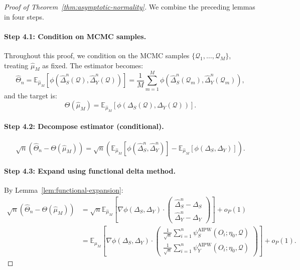 \begin{proof}[Proof of Theorem~\ref{thm:asymptotic-normality}]
We combine the preceding lemmas in four steps.

\paragraph{Step 4.1: Condition on MCMC samples.}
Throughout this proof, we condition on the MCMC samples $\{\mathcal{Q}_1, \ldots, \mathcal{Q}_M\}$, treating $\hat{\mu}_M$ as fixed. The estimator becomes:
\begin{equation}
\hat{\Theta}_n = \mathbb{E}_{\hat{\mu}_M}[\phi(\hat{\Delta}_S^n(\mathcal{Q}), \hat{\Delta}_Y^n(\mathcal{Q}))] = \frac{1}{M}\sum_{m=1}^M \phi(\hat{\Delta}_S^n(\mathcal{Q}_m), \hat{\Delta}_Y^n(\mathcal{Q}_m)),
\end{equation}
and the target is:
\begin{equation}
\Theta(\hat{\mu}_M) = \mathbb{E}_{\hat{\mu}_M}[\phi(\Delta_S(\mathcal{Q}), \Delta_Y(\mathcal{Q}))].
\end{equation}

\paragraph{Step 4.2: Decompose estimator (conditional).}
\begin{equation}
\sqrt{n}(\hat{\Theta}_n - \Theta(\hat{\mu}_M)) = \sqrt{n}\left(\mathbb{E}_{\hat{\mu}_M}[\phi(\hat{\Delta}_S^n, \hat{\Delta}_Y^n)] - \mathbb{E}_{\hat{\mu}_M}[\phi(\Delta_S, \Delta_Y)]\right).
\end{equation}

\paragraph{Step 4.3: Expand using functional delta method.}
By Lemma~\ref{lem:functional-expansion}:
\begin{align}
\sqrt{n}(\hat{\Theta}_n - \Theta(\hat{\mu}_M)) &= \sqrt{n} \mathbb{E}_{\hat{\mu}_M}\left[\nabla\phi(\Delta_S, \Delta_Y) \cdot \begin{pmatrix} \hat{\Delta}_S^n - \Delta_S \\ \hat{\Delta}_Y^n - \Delta_Y \end{pmatrix}\right] + o_P(1) \\
&= \mathbb{E}_{\hat{\mu}_M}\left[\nabla\phi(\Delta_S, \Delta_Y) \cdot \begin{pmatrix} \frac{1}{\sqrt{n}}\sum_{i=1}^n \psi_S^{\text{AIPW}}(O_i; \eta_0, \mathcal{Q}) \\ \frac{1}{\sqrt{n}}\sum_{i=1}^n \psi_Y^{\text{AIPW}}(O_i; \eta_0, \mathcal{Q}) \end{pmatrix}\right] + o_P(1).
\end{align}


\end{proof}
